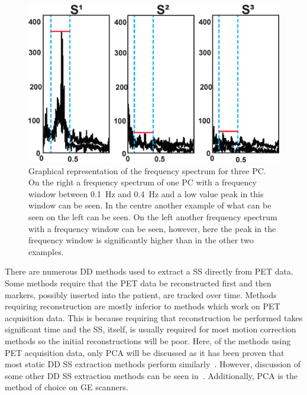                 \begin{figure}
                    \centering
                        
                    \includegraphics[width=1.0\linewidth]{figures/background_pca_window.png}
                        
                    \captionsetup{singlelinecheck=false}
                    \caption{
                        Graphical representation of the frequency spectrum for three \gls{PC}. On the right a frequency spectrum of one \gls{PC} with a frequency window between \SI{0.1}{\hertz} and \SI{0.4}{\hertz} and a low value peak in this window can be seen. In the centre another example of what can be seen on the left can be seen. On the left another frequency spectrum with a frequency window can be seen, however, here the peak in the frequency window is significantly higher than in the other two examples.
                    }
                    \label{fig:data_driven_pca_window}
                \end{figure}
                
                There are numerous \gls{DD} methods used to extract a \gls{SS} directly from \gls{PET} data. Some methods require that the \gls{PET} data be reconstructed first and then markers, possibly inserted into the patient, are tracked over time. Methods requiring reconstruction are mostly inferior to methods which work on \gls{PET} acquisition data. This is because requiring that reconstruction be performed takes significant time and the \gls{SS}, itself, is usually required for most motion correction methods so the initial reconstructions will be poor. Here, of the methods using \gls{PET} acquisition data, only \gls{PCA} will be discussed as it has been proven that most static \gls{DD} \gls{SS} extraction methods perform similarly~\parencite{Thielemans2013ComparisonData}. However, discussion of some other \gls{DD} \gls{SS} extraction methods can be seen in~. Additionally, \gls{PCA} is the method of choice on \gls{GE} scanners.
                
